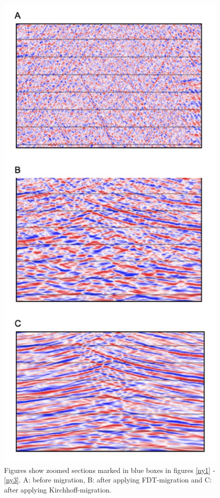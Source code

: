 \documentclass[10pt,a4paper]{article}
\begin{document}
\begin{figure}[H]
\includegraphics[scale=0.4]{ny5.jpg}
\caption{Figures show zoomed sections marked in blue boxes in figures \ref{ny1} - \ref{ny3}. 
A: before migration, B: after applying FDT-migration and C: after applying Kirchhoff-migration.}
\label{ny5}
\end{figure}
\end{document}
